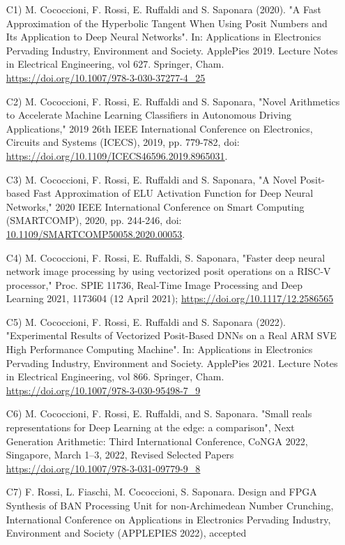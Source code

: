 \begin{enumerate} 
    \item [C1)] M. Cococcioni, F. Rossi, E. Ruffaldi and S. Saponara (2020). "A Fast Approximation of the Hyperbolic Tangent When Using Posit Numbers and Its Application to Deep Neural Networks". In: Applications in Electronics Pervading Industry, Environment and Society. ApplePies 2019. Lecture Notes in Electrical Engineering, vol 627. Springer, Cham. \url{https://doi.org/10.1007/978-3-030-37277-4_25}
    \item [C2)] M. Cococcioni, F. Rossi, E. Ruffaldi and S. Saponara, "Novel Arithmetics to Accelerate Machine Learning Classifiers in Autonomous Driving Applications," 2019 26th IEEE International Conference on Electronics, Circuits and Systems (ICECS), 2019, pp. 779-782, doi: \url{https://doi.org/10.1109/ICECS46596.2019.8965031}.
    \item [C3)] M. Cococcioni, F. Rossi, E. Ruffaldi and S. Saponara, "A Novel Posit-based Fast Approximation of ELU Activation Function for Deep Neural Networks," 2020 IEEE International Conference on Smart Computing (SMARTCOMP), 2020, pp. 244-246, doi: \url{10.1109/SMARTCOMP50058.2020.00053}.
    \item [C4)] M. Cococcioni, F. Rossi, E. Ruffaldi, S. Saponara, "Faster deep neural network image processing by using vectorized posit operations on a RISC-V processor," Proc. SPIE 11736, Real-Time Image Processing and Deep Learning 2021, 1173604 (12 April 2021); \url{https://doi.org/10.1117/12.2586565}
    \item [C5)] M. Cococcioni, F. Rossi, E. Ruffaldi and S. Saponara (2022). "Experimental Results of Vectorized Posit-Based DNNs on a Real ARM SVE High Performance Computing Machine". In: Applications in Electronics Pervading Industry, Environment and Society. ApplePies 2021. Lecture Notes in Electrical Engineering, vol 866. Springer, Cham. \url{https://doi.org/10.1007/978-3-030-95498-7_9}
    \item[C6)] M. Cococcioni,  F. Rossi,  E. Ruffaldi,  and S. Saponara. "Small reals representations for Deep Learning at the edge: a comparison", Next Generation Arithmetic: Third International Conference, CoNGA 2022, Singapore, March 1–3, 2022, Revised Selected Papers \url{https://doi.org/10.1007/978-3-031-09779-9_8}
    \item[C7)] F. Rossi, L. Fiaschi, M. Cococcioni, S. Saponara. Design and FPGA Synthesis of BAN Processing Unit for non-Archimedean Number Crunching, International Conference on Applications in Electronics Pervading Industry, Environment and Society (APPLEPIES 2022), accepted
\end{enumerate}


